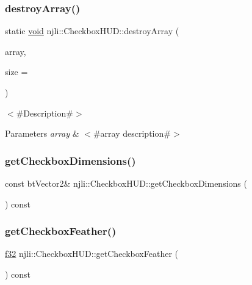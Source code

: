 \subsubsection{\texorpdfstring{destroy\+Array()}{destroyArray()}}
{\footnotesize\ttfamily static \mbox{\hyperlink{_thread_8h_af1e856da2e658414cb2456cb6f7ebc66}{void}} njli\+::\+Checkbox\+H\+U\+D\+::destroy\+Array (\begin{DoxyParamCaption}\item[{\mbox{\hyperlink{classnjli_1_1_checkbox_h_u_d}{Checkbox\+H\+UD}} $\ast$$\ast$}]{array,  }\item[{const \mbox{\hyperlink{_util_8h_a10e94b422ef0c20dcdec20d31a1f5049}{u32}}}]{size = {} }\end{DoxyParamCaption})\hspace{0.3cm}{\ttfamily [static]}}

$<$\#\+Description\#$>$


\begin{DoxyParams}{Parameters}
{\em array} & $<$\#array description\#$>$ \\
\hline
\end{DoxyParams}
\mbox{\label{classnjli_1_1_checkbox_h_u_d_ab0da419b8b5ede1ec19fdb21e110666d}} 
\subsubsection{\texorpdfstring{get\+Checkbox\+Dimensions()}{getCheckboxDimensions()}}
{\footnotesize\ttfamily const bt\+Vector2\& njli\+::\+Checkbox\+H\+U\+D\+::get\+Checkbox\+Dimensions (\begin{DoxyParamCaption}{ }\end{DoxyParamCaption}) const}

\mbox{\label{classnjli_1_1_checkbox_h_u_d_a44f03f6c6af1876befd9f32cf1c442be}} 
\subsubsection{\texorpdfstring{get\+Checkbox\+Feather()}{getCheckboxFeather()}}
{\footnotesize\ttfamily \mbox{\hyperlink{_util_8h_a5f6906312a689f27d70e9d086649d3fd}{f32}} njli\+::\+Checkbox\+H\+U\+D\+::get\+Checkbox\+Feather (\begin{DoxyParamCaption}{ }\end{DoxyParamCaption}) const}

